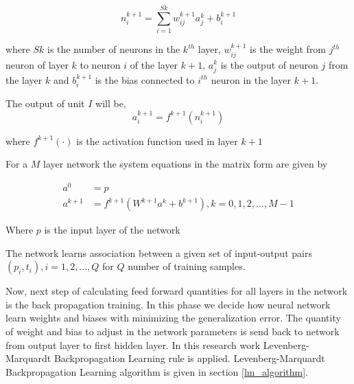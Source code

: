 \documentclass[12pt,a4paper,oneside]{article}
\numberwithin{equation}{section}
\numberwithin{algorithm}{section}
\begin{document}
\begin{equation}
n^{k+1}_i=\sum\limits_{i=1}^{Sk}w^{k+1}_{ij}a^{k}_{j}+b^{k+1}_i
\end{equation}\label{equation_feed_forward_input_to_k_layer}

where $Sk$ is the number of neurons in the $k^{th}$ layer, $w^{k+1}_{ij}$ is the weight from $j^{th}$ neuron of layer $k$ to neuron $i$ of the layer $k+1$, $a^{k}_{j}$ is the output of neuron $j$ from the layer $k$ and $b^{k+1}_{i}$ is the bias connected to $i^{th}$ neuron in the layer $k+1$.

The output of unit $I$ will be,
\begin{equation}
a^{k+1}_{i}=f^{k+1}(n^{k+1}_{i})
\end{equation}\label{equation_feed_forward_output_from_k_layer}

where $f^{k+1}(\cdot)$ is the activation function used in layer $k+1$

For a $M$ layer network the system equations in the matrix form are given by

\begin{align}\label{equation_feed_forward_step_in_matrix}
a^{0}&=p\\
a^{k+1}&= f^{k+1}(W^{k+1}a^k+b^{k+1}), k=0,1,2,...,M-1
\end{align}

Where $p$ is the input layer of the network

The network learns association between a given set of input-output pairs ${(p_i,t_i), i=1,2,...,Q}$ for $Q$ number of training samples.



Now, next step of calculating feed forward quantities for all layers in the network is the back propagation training. In this phase we decide how neural network learn weights and biases with minimizing the generalization error. The quantity of weight and bias to adjust in the network parameters is send back to network from output layer to first hidden layer. In this research work Levenberg-Marquardt Backpropagation Learning rule is applied. Levenberg-Marquardt Backpropagation Learning algorithm is given in section \ref{lm_algorithm}.
\end{document}
